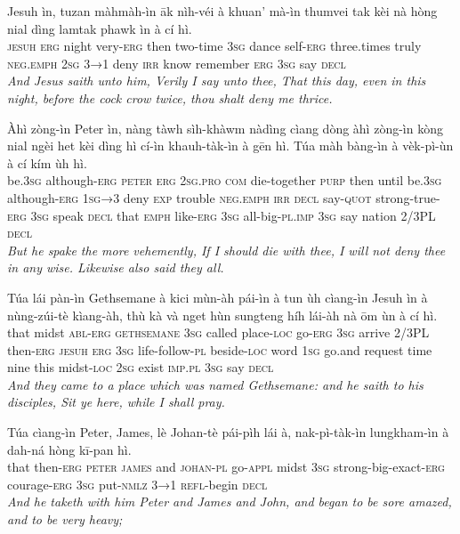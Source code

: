 \documentclass[11pt,a4paper]{article}
\begin{document}
\begin{exe}
\gll Jesuh ìn, tuzan màhmàh-ìn āk nìh-véi à khuan' mà-ìn thumvei tak kèi nà hòng nial dìng lamtak phawk ìn à cí hì. \\
     \textsc{jesuh} \textsc{erg} night very-\textsc{erg} then two-time \textsc{3sg} dance self-\textsc{erg} three.times truly \textsc{neg}.\textsc{emph} \textsc{2sg} \textsc{3→1} deny \textsc{irr} know remember \textsc{erg} \textsc{3sg} say \textsc{decl} \\
\glt \textcolor{kjvcolor}{\textit{And Jesus saith unto him, Verily I say unto thee, That this day, even in this night, before the cock crow twice, thou shalt deny me thrice.}}

\gll Àhì zòng-ìn Peter ìn, nàng tàwh sìh-khàwm nàdìng cìang dòng àhì zòng-ìn kòng nial ngèi het kèi dìng hì cí-ìn khauh-tàk-ìn à gēn hì. Túa màh bàng-ìn à vèk-pì-ùn à cí kím ùh hì. \\
     be.\textsc{3sg} although-\textsc{erg} \textsc{peter} \textsc{erg} \textsc{2sg}.\textsc{pro} \textsc{com} die-together \textsc{purp} then until be.\textsc{3sg} although-\textsc{erg} \textsc{1sg→3} deny \textsc{exp} trouble \textsc{neg}.\textsc{emph} \textsc{irr} \textsc{decl} say-\textsc{quot} strong-true-\textsc{erg} \textsc{3sg} speak \textsc{decl} that \textsc{emph} like-\textsc{erg} \textsc{3sg} all-big-\textsc{pl}.\textsc{imp} \textsc{3sg} say nation 2/3PL \textsc{decl} \\
\glt \textcolor{kjvcolor}{\textit{But he spake the more vehemently, If I should die with thee, I will not deny thee in any wise. Likewise also said they all.}}

\gll Túa lái pàn-ìn Gethsemane à kici mùn-àh pái-ìn à tun ùh cìang-ìn Jesuh ìn à nùng-zúi-tè kìang-àh, thù kà và nget hùn sungteng híh lái-àh nà ōm ùn à cí hì. \\
     that midst \textsc{abl}-\textsc{erg} \textsc{gethsemane} \textsc{3sg} called place-\textsc{loc} go-\textsc{erg} \textsc{3sg} arrive 2/3PL then-\textsc{erg} \textsc{jesuh} \textsc{erg} \textsc{3sg} life-follow-\textsc{pl} beside-\textsc{loc} word \textsc{1sg} go.and request time nine this midst-\textsc{loc} \textsc{2sg} exist \textsc{imp}.\textsc{pl} \textsc{3sg} say \textsc{decl} \\
\glt \textcolor{kjvcolor}{\textit{And they came to a place which was named Gethsemane: and he saith to his disciples, Sit ye here, while I shall pray.}}

\gll Túa cìang-ìn Peter, James, lè Johan-tè pái-pìh lái à, nak-pì-tàk-ìn lungkham-ìn à dah-ná hòng kī-pan hì. \\
     that then-\textsc{erg} \textsc{peter} \textsc{james} and \textsc{johan}-\textsc{pl} go-\textsc{appl} midst \textsc{3sg} strong-big-exact-\textsc{erg} courage-\textsc{erg} \textsc{3sg} put-\textsc{nmlz} \textsc{3→1} \textsc{refl}-begin \textsc{decl} \\
\glt \textcolor{kjvcolor}{\textit{And he taketh with him Peter and James and John, and began to be sore amazed, and to be very heavy;}}


\end{exe}
\end{document}
